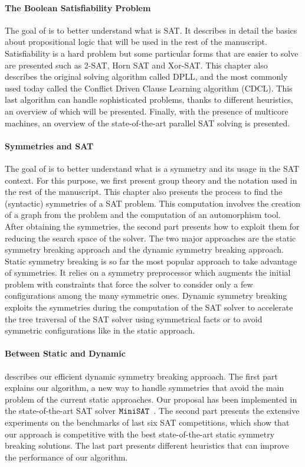 \paragraph{The Boolean Satisfiability Problem}
The goal of  is to better understand what is SAT. 
It describes in detail the basics
about propositional logic that will be used in the rest of the manuscript. Satisfiability is a hard
problem but some particular forms that are easier to solve are presented such as 2-SAT, Horn SAT and Xor-SAT.
This chapter also describes the original solving algorithm called DPLL, and the
most commonly used today called the Conflict Driven Clause Learning algorithm (CDCL).
This last algorithm can handle sophisticated problems, thanks to different heuristics, 
an overview of which will be presented. Finally, with the presence of multicore machines, an overview
 of the state-of-the-art parallel SAT solving is presented.

\paragraph{Symmetries and SAT}
The goal of  is to better understand what is a symmetry and its usage
in the SAT context. For this purpose, we first present group theory and the notation used
in the rest of the manuscript.
This chapter also presents the process to find the (syntactic) symmetries of a SAT problem.
 This computation involves the creation of a graph from the problem and the computation of an
automorphism tool. After obtaining the symmetries, the second part presents how to
exploit them for reducing the search space of the solver. The two major approaches 
are the static symmetry breaking approach and the dynamic symmetry breaking approach.
Static symmetry breaking is so far the most popular approach to take advantage of symmetries. It relies on a symmetry preprocessor which augments the initial problem with constraints that force the solver to consider only a few configurations among the many symmetric ones.
Dynamic symmetry breaking exploits the symmetries during the computation of the SAT solver to accelerate the
tree traversal of the SAT solver using symmetrical facts or to avoid symmetric configurations like in the 
static approach.

\paragraph{Between Static and Dynamic}
 describes our efficient dynamic symmetry breaking approach.
The first part explains our algorithm, a new way to handle symmetries that avoid the main problem
of the current static approaches. Our proposal has been implemented in the state-of-the-art
SAT solver $\texttt{MiniSAT}$~\cite{een2003extensible}. The second part presents the extensive experiments on the benchmarks of last six SAT competitions,
which show that our approach is competitive with the best state-of-the-art static symmetry breaking solutions.
The last part presents different heuristics that can improve the performance of our algorithm.

